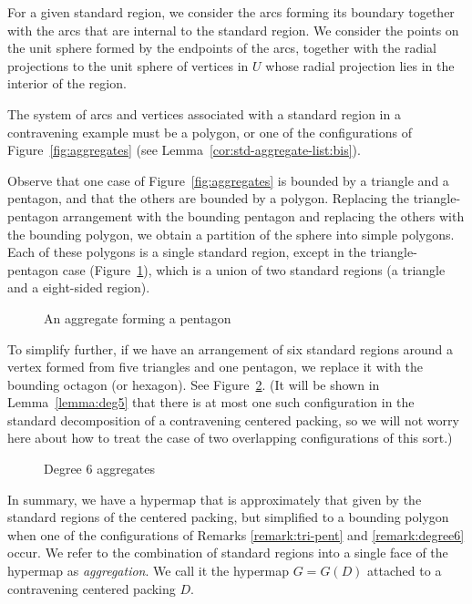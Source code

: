For a given standard region, we consider the arcs forming its
boundary together with the arcs that are internal to the standard
region.  We consider the points on the unit sphere formed by the
endpoints of the arcs, together with the radial projections to the
unit sphere of vertices in $U$ whose radial projection lies in the
interior of the region.

\begin{remark}
The system of arcs and vertices associated with a standard region in
a contravening example must be a polygon, or one of the
configurations of Figure~\ref{fig:aggregates} (see
Lemma~\ref{cor:std-aggregate-list:bis}).
\end{remark}


\begin{remark} \label{remark:tri-pent}
Observe that one case of Figure~\ref{fig:aggregates} is bounded by a
triangle and a pentagon, and that the others are bounded by a
polygon. Replacing the triangle-pentagon arrangement with the
bounding pentagon and replacing the others with the bounding
polygon, we obtain a partition of the sphere into simple polygons.
Each of these polygons is a single standard region, except in the
triangle-pentagon case (Figure~\ref{fig:tri-pent}), which is a union
of two standard regions (a triangle and a eight-sided region).
\end{remark}
\begin{figure}[htb]
  \centering
  \caption{An aggregate forming a pentagon}
  \label{fig:tri-pent}
\end{figure}

\begin{remark}\label{remark:degree6}
To simplify further, if we have an arrangement of six standard
regions around a vertex formed from five triangles and one
pentagon, we replace it with the bounding octagon (or hexagon).
See Figure~\ref{fig:degree6}.  (It will be shown in
Lemma~\ref{lemma:deg5} that there is at most one such
configuration in the standard decomposition of a contravening
centered packing, so we will not worry here about how to treat the
case of two overlapping configurations of this sort.)
\end{remark}
\begin{figure}[htb]
  \centering
  \caption{Degree $6$ aggregates}
  \label{fig:degree6}
\end{figure}

In summary, we have a hypermap that is approximately that given by
the standard regions of the centered packing, but simplified to a
bounding polygon when one of the configurations of Remarks
\ref{remark:tri-pent} and \ref{remark:degree6} occur.  We refer to
the combination of standard regions into a single face of the
hypermap as {\it aggregation}.  We call it the hypermap $G = G(D)$
attached to a contravening centered packing $D$.
%

